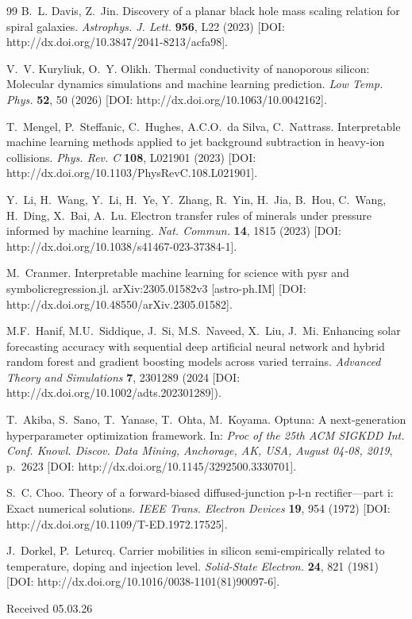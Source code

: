 \documentclass[fleqn,twoside,twocolumn,nofootinbib,showkeys]{revtex4} %
\begin{document}
\begin{thebibliography}{99}
B.~L. Davis, Z.~Jin. Discovery of a planar black hole mass scaling relation for spiral galaxies. \textit{Astrophys. J. Lett.} \textbf{956}, L22 (2023) [DOI: http://dx.doi.org/10.3847/2041-8213/acfa98].

V.~V. Kuryliuk, O.~Y. Olikh. Thermal conductivity of nanoporous silicon: Molecular dynamics simulations and machine learning prediction. \textit{Low Temp. Phys.} \textbf{52}, 50 (2026) [DOI: http://dx.doi.org/10.1063/10.0042162].

T.~Mengel, P.~Steffanic, C.~Hughes, A.C.O.~da Silva, C.~Nattrass. Interpretable machine learning methods applied to jet background subtraction in heavy-ion collisions. \textit{Phys. Rev. C} \textbf{108}, L021901 (2023) [DOI: http://dx.doi.org/10.1103/PhysRevC.108.L021901].

Y.~Li, H.~Wang, Y.~Li, H.~Ye, Y.~Zhang, R.~Yin, H.~Jia, B.~Hou, C.~Wang, H.~Ding, X.~Bai, A.~Lu. Electron transfer rules of minerals under pressure informed by machine learning. \textit{Nat. Commun.} \textbf{14}, 1815 (2023) [DOI: http://dx.doi.org/10.1038/s41467-023-37384-1].

M.~Cranmer. Interpretable machine learning for science with pysr and symbolicregression.jl. arXiv:2305.01582v3 [astro-ph.IM] [DOI: http://dx.doi.org/10.48550/arXiv.2305.01582].


M.F.~Hanif, M.U.~Siddique, J.~Si, M.S.~Naveed, X.~Liu, J.~Mi. Enhancing solar forecasting accuracy with sequential deep artificial neural network and hybrid random forest and gradient boosting models across varied terrains. \textit{Advanced Theory and Simulations} \textbf{7}, 2301289 (2024 [DOI: http://dx.doi.org/10.1002/adts.202301289]).


T.~Akiba, S.~Sano, T.~Yanase, T.~Ohta, M.~Koyama. Optuna: A next-generation hyperparameter optimization framework. 
In: \textit{Proc of the 25th ACM SIGKDD Int. Conf. Knowl. Discov. Data Mining, Anchorage, AK, USA, August 04-08, 2019}, p.~2623  [DOI: http://dx.doi.org/10.1145/3292500.3330701].

S.~C. Choo. Theory of a forward-biased diffused-junction p-l-n rectifier—part i: Exact numerical solutions. \textit{IEEE Trans. Electron Devices} \textbf{19}, 954 (1972) [DOI: http://dx.doi.org/10.1109/T-ED.1972.17525].

J.~Dorkel, P.~Leturcq. Carrier mobilities in silicon semi-empirically related to temperature, doping and injection level. \textit{Solid-State Electron.} \textbf{24}, 821 (1981) [DOI: http://dx.doi.org/10.1016/0038-1101(81)90097-6].

\begin{flushright}
{\footnotesize Received 05.03.26}
\end{flushright}
\end{thebibliography}
\end{document}
